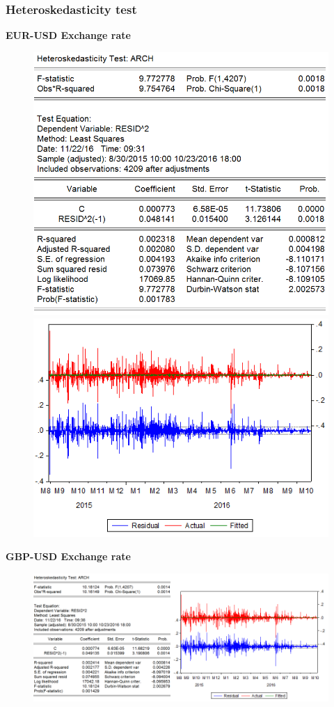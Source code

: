 \documentclass[11pt]{report}
\begin{document}
\subsubsection*{Heteroskedasticity test}
\textbf{EUR-USD Exchange rate}
\begin{figure}[!h]
\includegraphics[scale=0.5]{Appendix/chap3/6}
\includegraphics[scale=1]{Appendix/chap3/7}
\end{figure}
\smallbreak
\textbf{GBP-USD Exchange rate}
\begin{figure}[!h]
\includegraphics[scale=1.2]{Appendix/chap3/8}
\end{figure}
\clearpage
\end{document}
